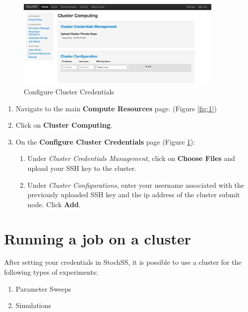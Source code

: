 \begin{figure}[!ht]
\centering
\includegraphics[width=100mm,scale=0.5]{cluster/figure2.png}
\caption{Configure Cluster Credentials}
\label{fig:2}
\end{figure}

\begin{enumerate}
\item Navigate to the main \textbf{Compute Resources} page. (Figure \ref{fig:1})
\item Click on \textbf{Cluster Computing}.
\item On the \textbf{Configure Cluster Credentials} page (Figure \ref{fig:2}):
  \begin{enumerate}
      \item Under \textit{Cluster Credentials Management}, click on \textbf{Choose Files} and upload your SSH key to the cluster.
      \item Under \textit{Cluster Configurations}, enter your username associated with the previously uploaded SSH key and the ip address of the cluster submit node. Click \textbf{Add}.
  \end{enumerate}
\end{enumerate}

\section{Running a job on a cluster}
After setting your credentials in StochSS, it is possible to use a cluster for the following types of experiments:
\begin{enumerate}
\item Parameter Sweeps
\item Simulations
\end{enumerate}

